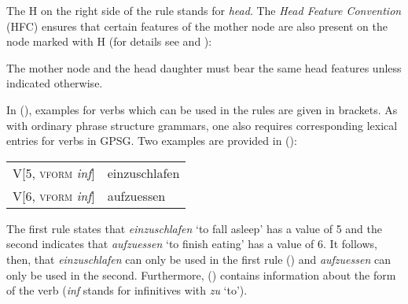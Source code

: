 The H on the right side of the rule stands for \emph{head}. The \emph{Head Feature Convention}
(HFC) ensures that certain features
of the mother node are also present on the node marked with H (for details see
\citealp*[Section~5.4]{GKPS85a} and \citealp[67]{Uszkoreit87a}):
\begin{principle-break}
The mother node and the head daughter must bear the same head features unless indicated otherwise.
\end{principle-break}
%
In (), examples for verbs which can be used in the rules are given in brackets. As with ordinary phrase structure grammars, one also requires
corresponding lexical entries for verbs in GPSG. Two examples are provided in ():
\ea
\begin{tabular}[t]{@{}l@{~$\to$~}l@{}}
V[5, \textsc{vform} \emph{inf}]  & einzuschlafen\\
V[6, \textsc{vform} \emph{inf}]  & aufzuessen\\
\end{tabular}
\z
The first rule states that \emph{einzuschlafen} `to fall asleep' has a \subcat value of 5 and the second indicates that \emph{aufzuessen} `to finish eating'  has a
\subcat value of 6. It follows, then, that \emph{einzuschlafen} can only be used in the first rule () and \emph{aufzuessen} can
only be used in the second. Furthermore, () contains information about the form of the verb
(\emph{inf} stands for infinitives with \emph{zu} `to').

